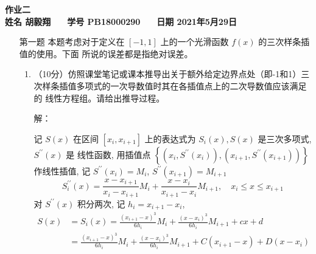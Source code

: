 \documentclass[12pt,a4paper,UTF8]{ctexart}
\theoremstyle{nonumberplain}
\begin{document}


\begin{center}
    \textbf{作业二}\\
    \textbf{姓名 胡毅翔 ~~ 学号 PB18000290 ~~ 日期 2021年5月29日}\\
\end{center}

\begin{center}
    \fbox{
        \begin{minipage}{40em}
            \vspace{5cm}
            \hspace{20cm}
        \end{minipage}}
\end{center}
\vspace{1cm}

\begin{enumerate}
    \item[第一题] 本题考虑对于定义在 $[-1,1]$ 上的一个光滑函数 $f(x)$ 的三次样条插值的使用。下面 所说的误差都是指绝对误差。
          \begin{enumerate}\item（10分）仿照课堂笔记或课本推导出关于额外给定边界点处（即-1和1）三
                    次样条插值多项式的一次导数值时其在各插值点上的二次导数值应该满足的
                    线性方程组。请给出推导过程。
                    \par 解：
                    \par 记 $S(x)$ 在区间 $\left[x_{i}, x_{i+1}\right]$ 上的表达式为 $S_{i}(x), S(x)$ 是三次多项式, $S^{\prime \prime}(x)$ 是 线性函数, 用插值点 $\left\{\left(x_{i}, S^{\prime \prime}\left(x_{i}\right)\right),\left(x_{i+1}, S^{\prime \prime}\left(x_{i+1}\right)\right)\right\}$ 作线性插值, 记 $S^{\prime \prime}\left(x_{i}\right)=M_{i}$,
                    $S^{\prime \prime}\left(x_{i+1}\right)=M_{i+1}$
                    $$
                        S_{i}^{\prime \prime}(x)=\frac{x-x_{i+1}}{x_{i}-x_{i+1}} M_{i}+\frac{x-x_{i}}{x_{i+1}-x_{i}} M_{i+1}, \quad x_{i} \leqslant x \leqslant x_{i+1}
                    $$
                    对 $S^{\prime \prime}(x)$ 积分两次, 记 $h_{i}=x_{i+1}-x_{i}$,
                    $$
                        \begin{aligned}
                            S(x) & =S_{i}(x)=\frac{\left(x_{i+1}-x\right)^{3}}{6 h_{i}} M_{i}+\frac{\left(x-x_{i}\right)^{3}}{6 h_{i}} M_{i+1}+c x+d                                \\
                                 & =\frac{\left(x_{i+1}-x\right)^{3}}{6 h_{i}} M_{i}+\frac{\left(x-x_{i}\right)^{3}}{6 h_{i}} M_{i+1}+C\left(x_{i+1}-x\right)+D\left(x-x_{i}\right)

\end{aligned}$$
\end{enumerate}
\end{enumerate}
\end{document}
